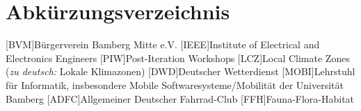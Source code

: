 \chapter*{Abkürzungsverzeichnis}

\begin{acronym}
    [BVM]{Bürgerverein Bamberg Mitte e.V.}
    [IEEE]{Institute of Electrical and Electronics Engineers}
    [PIW]{Post-Iteration Workshops}
    [LCZ]{Local Climate Zones (\textit{zu deutsch:} Lokale Klimazonen)}
    [DWD]{Deutscher Wetterdienst}
    [MOBI]{Lehrstuhl für Informatik, insbesondere Mobile Softwaresysteme/Mobilität der Universität Bamberg}
    [ADFC]{Allgemeiner Deutscher Fahrrad-Club}
    [FFH]{Fauna-Flora-Habitat}
\end{acronym}